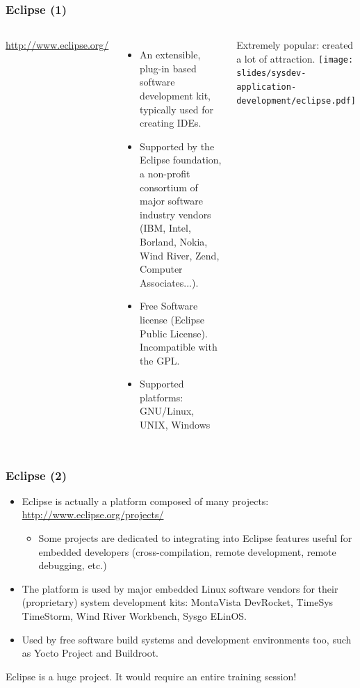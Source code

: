 \begin{frame}
  \frametitle{Eclipse (1)}
  \begin{columns}[T]
    \url{http://www.eclipse.org/}
    \begin{itemize}
    \item An extensible, plug-in based software development kit,
      typically used for creating IDEs.
    \item Supported by the Eclipse foundation, a non-profit consortium
      of major software industry vendors (IBM, Intel, Borland, Nokia,
      Wind River, Zend, Computer Associates...).
    \item Free Software license (Eclipse Public License). Incompatible
      with the GPL.
    \item Supported platforms: GNU/Linux, UNIX, Windows
    \end{itemize}
    Extremely popular: created a lot of attraction.
    \texttt{[image: slides/sysdev-application-development/eclipse.pdf]}
  \end{columns}
\end{frame}

\begin{frame}
  \frametitle{Eclipse (2)}
  \begin{itemize}
  \item Eclipse is actually a platform composed of many projects:\\
    \url{http://www.eclipse.org/projects/}
    \begin{itemize}
    \item Some projects are dedicated to integrating into Eclipse
      features useful for embedded developers (cross-compilation,
      remote development, remote debugging, etc.)
    \end{itemize}
  \item The platform is used by major embedded Linux software vendors
    for their (proprietary) system development kits: MontaVista
    DevRocket, TimeSys TimeStorm, Wind River Workbench, Sysgo ELinOS.
  \item Used by free software build systems and development environments
    too, such as Yocto Project and Buildroot.
  \end{itemize}
  Eclipse is a huge project.  It would require an entire training
  session!
\end{frame}

